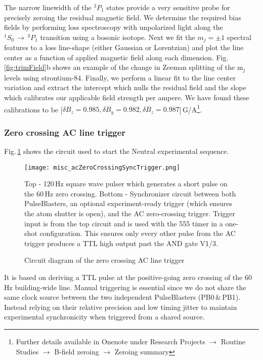 The narrow linewidth of the $^3P_1$ states provide a very sensitive probe for precisely zeroing the residual magnetic field.
We determine the required bias fields by performing loss spectroscopy with unpolarized light along the $^1S_0\,\rightarrow\,^3P_1$ transition using a bosonic isotope.
Next we fit the $m_j=\pm1$ spectral features to a loss line-shape (either Gaussian or Lorentzian) and plot the line center as a function of applied magnetic field along each dimension.
Fig.\,\ref{fig:trimField}b shows an example of the change in Zeeman splitting of the m$_j$ levels using strontium-84.
Finally, we perform a linear fit to the line center variation and extract the intercept which nulls the residual field and the slope which calibrates our applicable field strength per ampere. 
We have found these calibrations to be [$\delta B_z = 0.985, \delta B_y = 0.982, \delta B_z = 0.987$]\,G/A\footnote{Further details available in Onenote under Research Projects $\rightarrow$ Routine Studies $\rightarrow$ B-field zeroing $\rightarrow$ Zeroing summary}.

\subsubsection{Zero crossing AC line trigger} \label{sec:expTrig}
Fig.\,\ref{fig:zeroCrossTrig} shows the circuit used to start the Neutral experimental sequence.
	\begin{figure}
		\centerline{
		\texttt{[image: misc\_acZeroCrossingSyncTrigger.png]}}
		\caption{Circuit diagram of the zero crossing AC line trigger}{Top - 120\,Hz square wave pulser which generates a short pulse on the 60\,Hz zero crossing. Bottom - Synchronizer circuit between both PulseBlasters, an optional experiment-ready trigger (which ensures the atom shutter is open), and the AC zero-crossing trigger. Trigger input is from the top circuit and is used with the 555 timer in a one-shot configuration. This ensures only every other pulse from the AC trigger produces a TTL high output past the AND gate V1/3.}
		\label{fig:zeroCrossTrig}
	\end{figure} 
It is based on deriving a TTL pulse at the positive-going zero crossing of the 60\,Hz building-wide line.
Manual triggering is essential since we do not share the same clock source between the two independent PulseBlasters (PB0\,\&\,PB1).
Instead relying on their relative precision and low timing jitter to maintain experimental synchronicity when triggered from a shared source.

